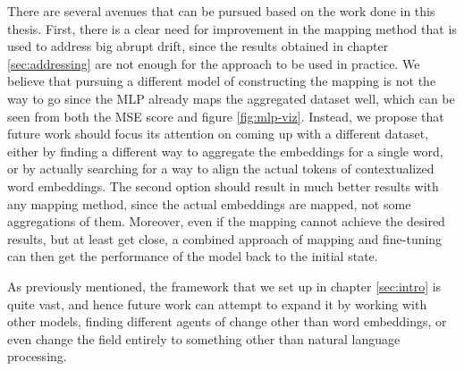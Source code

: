 \documentclass[12pt]{extreport}
\begin{document}
There are several avenues that can be pursued based on the work done in this thesis. First, there is a clear need for improvement in the mapping method that is used to address big abrupt drift, since the results obtained in chapter \ref{sec:addressing} are not enough for the approach to be used in practice. We believe that pursuing a different model of constructing the mapping is not the way to go since the MLP already maps the aggregated dataset well, which can be seen from both the MSE score and figure \ref{fig:mlp-viz}. Instead, we propose that future work should focus its attention on coming up with a different dataset, either by finding a different way to aggregate the embeddings for a single word, or by actually searching for a way to align the actual tokens of contextualized word embeddings. The second option should result in much better results with any mapping method, since the actual embeddings are mapped, not some aggregations of them. Moreover, even if the mapping cannot achieve the desired results, but at least get close, a combined approach of mapping and fine-tuning can then get the performance of the model back to the initial state.

As previously mentioned, the framework that we set up in chapter \ref{sec:intro} is quite vast, and hence future work can attempt to expand it by working with other models, finding different agents of change other than word embeddings, or even change the field entirely to something other than natural language processing.



\end{document}
